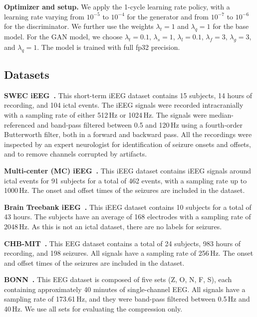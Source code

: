 \documentclass{article} %
\begin{document}
\textbf{Optimizer and setup.} We apply the 1-cycle learning rate policy, with a learning rate varying from $10^{-5}$ to $10^{-4}$ for the generator and from $10^{-7}$ to $10^{-6}$ for the discriminator. We further use the weights $\lambda_t = 1$ and $\lambda_q = 1$ for the base model. For the GAN model, we choose $\lambda_t = 0.1$, $\lambda_s = 1$, $\lambda_l = 0.1$, $\lambda_f = 3$, $\lambda_g = 3$, and $\lambda_q = 1$. The model is trained with full fp32 precision.


\subsection{Datasets}

\textbf{SWEC iEEG~\citep{Burrello2019}.} This short-term iEEG dataset contains 15 subjects, 14 hours of recording, and 104 ictal events. The iEEG signals were recorded intracranially with a sampling rate of either 512\,Hz or 1024\,Hz. The signals were median-referenced and band-pass filtered between 0.5 and 120\,Hz using a fourth-order Butterworth filter, both in a forward and backward pass. All the recordings were inspected by an expert neurologist for identification of seizure onsets and offsets, and to remove channels corrupted by artifacts.

\textbf{Multi-center (MC) iEEG~\citep{Li2021}.} This iEEG dataset contains iEEG signals around ictal events for 91 subjects for a total of 462 events, with a sampling rate up to 1000\,Hz. The onset and offset times of the seizures are included in the dataset.


\textbf{Brain Treebank iEEG~\citep{Wang2024a}.} This iEEG dataset contains 10 subjects for a total of 43 hours. The subjects have an average of 168 electrodes with a sampling rate of 2048\,Hz. As this is not an ictal dataset, there are no labels for seizures.



\textbf{CHB-MIT~\citep{Shoeb2010, Shoeb2009}.} This EEG dataset contains a total of 24 subjects, 983 hours of recording, and 198 seizures. All signals have a sampling rate of 256\,Hz. The onset and offset times of the seizures are included in the dataset.

\textbf{BONN~\citep{Andrzejak2001}.} This EEG dataset is composed of five sets (Z, O, N, F, S), each containing approximately 40 minutes of single-channel EEG. All signals have a sampling rate of 173.61\,Hz, and they were band-pass filtered between 0.5\,Hz and 40\,Hz. We use all sets for evaluating the compression only.
\end{document}
